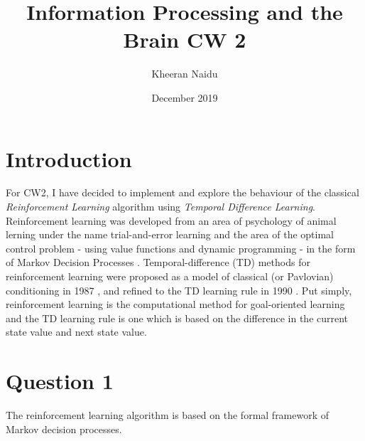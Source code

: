 \documentclass[10pt, a4paper]{article}
\title{Information Processing and the Brain CW 2}
\author{Kheeran Naidu}
\date{December 2019}
\begin{document}
\maketitle

\section*{Introduction}
For CW2, I have decided to implement and explore the behaviour of the classical \textit{Reinforcement Learning} algorithm using \textit{Temporal Difference Learning}. Reinforcement learning was developed from an area of psychology of animal lerning under the name trial-and-error learning \cite{woodworth1937experimental} and the area of the optimal control problem - using value functions and dynamic programming - in the form of Markov Decision Processes \cite{bellman1957markov}\cite{bellman1957dynamic}. Temporal-difference (TD) methods for reinforcement learning were proposed as a model of classical (or Pavlovian) conditioning in 1987 \cite{sutton1987temporal}, and refined to the TD learning rule in 1990 \cite{sutton1990time}. Put simply, reinforcement learning is the computational method for goal-oriented learning and the TD learning rule is one which is based on the difference in the current state value and next state value.

\section*{Question 1}
The reinforcement learning algorithm is based on the formal framework of Markov decision processes. 



\newpage

\printbibliography
\end{document}
